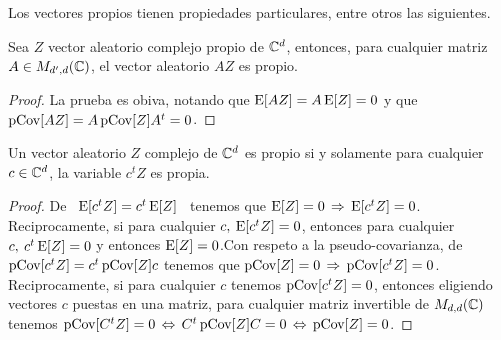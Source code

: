 Los vectores propios tienen  propiedades particulares, entre otros las siguientes.

\begin{teorema}\label{Teo:MP:PropioLineal}
%
  Sea  $Z$  vector  aleatorio  complejo  propio  de  $\mathbb{C}^d$,  entonces,  para
  cualquier matriz $A \in M_{d',d}(\mathbb{C})$, el vector aleatorio $A Z$ es propio.
\end{teorema}
\begin{proof}
  La prueba es obiva, notando que $\operatorname{E}[A Z]  = A \operatorname{E}[Z] = 0$ y que $\operatorname{pCov}[A Z]
  = A \operatorname{pCov}[Z] A^t = 0$.
\end{proof}


\begin{teorema}\label{Teo:MP:PropioProy}
%
  Un vector  aleatorio $Z$ complejo de  $\mathbb{C}^d$ es propio si  y solamente para
  cualquier $c \in \mathbb{C}^d$, la variable $c^t Z$ es propia.
\end{teorema}
\begin{proof}
  De \ $\operatorname{E}[c^t Z] = c^t \operatorname{E}[Z]$  \ tenemos que $\operatorname{E}[Z] = 0 \, \Rightarrow \,
  \operatorname{E}[c^t Z] =  0$. Reciprocamente, si para cualquier $c, \:  \operatorname{E}[c^t Z] = 0$,
  entonces  para  cualquier $c,  \:  c^t  \operatorname{E}[Z] =  0$  y  entonces $\operatorname{E}[Z]  =
  0$.\newline  Con  respeto a  la  pseudo-covarianza,  de  $\operatorname{pCov}[c^t Z]  =  c^t
  \operatorname{pCov}[Z]  c$ tenemos  que  $\operatorname{pCov}[Z] =  0  \, \Rightarrow  \,  \operatorname{pCov}[c^t Z]  =
  0$. Reciprocamente, si para cualquier $c$ tenemos $\operatorname{pCov}[c^t Z] = 0$, entonces
  eligiendo vectores $c$ puestas en una matriz, para cualquier matriz invertible
  de  $M_{d,d}(\mathbb{C})$ tenemos  $\operatorname{pCov}[C^t  Z]  = 0  \,  \Leftrightarrow \,  C^t
  \operatorname{pCov}[Z] C = 0 \, \Leftrightarrow \, \operatorname{pCov}[Z] = 0$.
\end{proof}



\label{Ssec:MP:MA}


